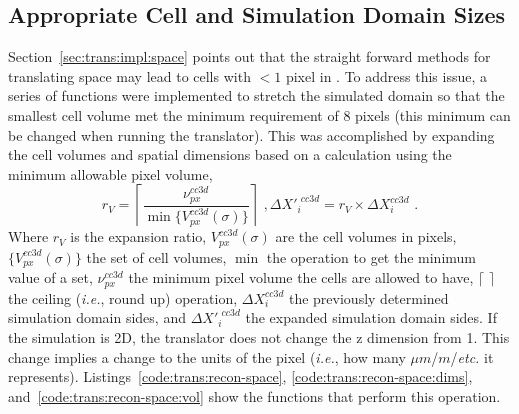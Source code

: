 \subsection{Appropriate Cell and Simulation Domain Sizes}\label{sec:trans:chal:space}
Section~\ref{sec:trans:impl:space} points out that the straight forward methods for translating space may lead to cells with $<1$ pixel in \ccd. To address this issue, a series of functions were implemented to stretch the simulated domain so that the smallest cell volume met the minimum requirement of 8 pixels (this minimum can be changed when running the translator). This was accomplished by expanding the cell volumes and spatial dimensions based on a calculation using the minimum allowable pixel volume, 
\begin{subequations}\label{eq:trans:expand}
\begin{equation}\label{eq:trans:expand:ratio}
    r_V = \left\lceil\frac{\nu^{cc3d}_{px}}{\min\{V^{cc3d}_{px}(\sigma)\}}\right\rceil\,\,,
\end{equation}
\begin{equation}\label{eq:trans:expand:new-side}
    \Delta X'^{\,\,cc3d}_i = r_V \times \Delta X^{cc3d}_i\,\,.
\end{equation}
\end{subequations}
\noindent Where $r_V$ is the expansion ratio, $V^{cc3d}_{px}(\sigma)$ are the cell volumes in pixels, $\{V^{cc3d}_{px}(\sigma)\}$ the set of cell volumes, $\min$ the operation to get the minimum value of a set, $\nu^{cc3d}_{px}$ the minimum pixel volume the cells are allowed to have, $\lceil\,\,\rceil$ the ceiling (\textit{i.e.}, round up) operation, $\Delta X^{cc3d}_i$ the previously determined simulation domain sides, and $\Delta X'^{\,\,cc3d}_i$ the expanded simulation domain sides. If the simulation is 2D, the translator does not change the z dimension from 1. This change implies a change to the units of the pixel (\textit{i.e.}, how many $\mu m$/$m$/\textit{etc.} it represents).
Listings~\ref{code:trans:recon-space}, \ref{code:trans:recon-space:dims}, and~\ref{code:trans:recon-space:vol} show the functions that perform this operation.


